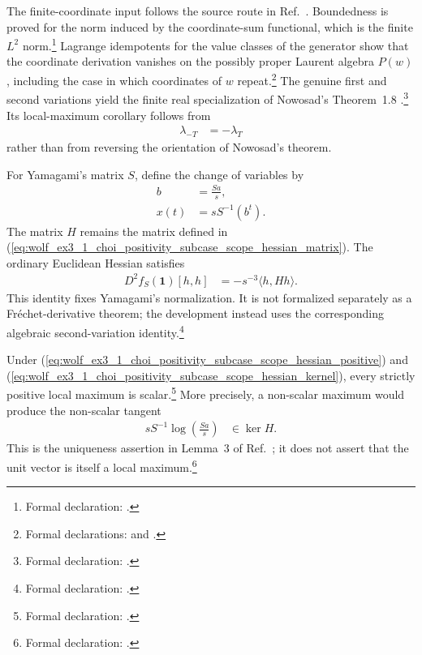 \documentclass{article}
\begin{document}
The finite-coordinate input follows the source route in
Ref.~\cite[pp.~409--418]{Nowosad1968Isoperimetric}. Boundedness is proved for
the norm induced by the coordinate-sum functional, which is the finite
$L^2$ norm.\footnote{Formal declaration:
.}
Lagrange idempotents for the value classes of the generator show that the
coordinate derivation vanishes on the possibly proper Laurent algebra $P(w)$,
including the case in which coordinates of $w$ repeat.\footnote{Formal
declarations:
 and
.}
The genuine first and second variations yield the finite real specialization
of Nowosad's Theorem~1.8
\cite{Nowosad1968Isoperimetric}.\footnote{Formal declaration:
.}
Its local-maximum corollary follows from
\begin{align}
    \lambda_{-T}
        &=-\lambda_T
    \label{eq:wolf_ex3_1_choi_positivity_subcase_scope_lambda_sign_identity}
\end{align}
rather than from reversing the orientation of Nowosad's theorem.

For Yamagami's matrix $S$, define the change of variables by
\begin{align}
    b
        &=\frac{Sa}{s},
    \label{eq:wolf_ex3_1_choi_positivity_subcase_scope_change_variable_b}\\
    x(t)
        &=sS^{-1}(b^t).
    \label{eq:wolf_ex3_1_choi_positivity_subcase_scope_change_variable_x}
\end{align}
The matrix $H$ remains the matrix defined in
(\ref{eq:wolf_ex3_1_choi_positivity_subcase_scope_hessian_matrix}). The
ordinary Euclidean Hessian satisfies
\begin{align}
    D^2f_S(\mathbf 1)[h,h]
        &=-s^{-3}\langle h,Hh\rangle.
    \label{eq:wolf_ex3_1_choi_positivity_subcase_scope_euclidean_hessian}
\end{align}
This identity fixes Yamagami's normalization. It is not formalized separately
as a Fr\'echet-derivative theorem; the development instead uses the
corresponding algebraic second-variation identity.\footnote{Formal declaration:
.}

Under
(\ref{eq:wolf_ex3_1_choi_positivity_subcase_scope_hessian_positive}) and
(\ref{eq:wolf_ex3_1_choi_positivity_subcase_scope_hessian_kernel}), every
strictly positive local maximum is scalar.\footnote{Formal declaration:
.}
More precisely, a non-scalar maximum would produce the non-scalar tangent
\begin{align}
    sS^{-1}\log\left(\frac{Sa}{s}\right)
        &\in\ker H.
    \label{eq:wolf_ex3_1_choi_positivity_subcase_scope_nonscalar_tangent}
\end{align}
This is the uniqueness assertion in Lemma~3 of
Ref.~\cite[p.~522]{Yamagami1993Cyclic}; it does not assert that the unit vector
is itself a local maximum.\footnote{Formal declaration:
.}
\end{document}
